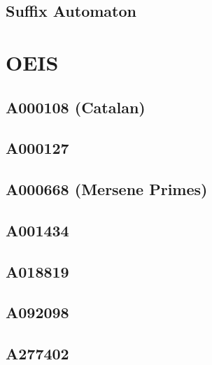 \subsection{Suffix Automaton}

\section{OEIS}
\subsection{A000108 (Catalan)}

\subsection{A000127}

\subsection{A000668 (Mersene Primes)}

\subsection{A001434}

\subsection{A018819}

\subsection{A092098}

\subsection{A277402}

